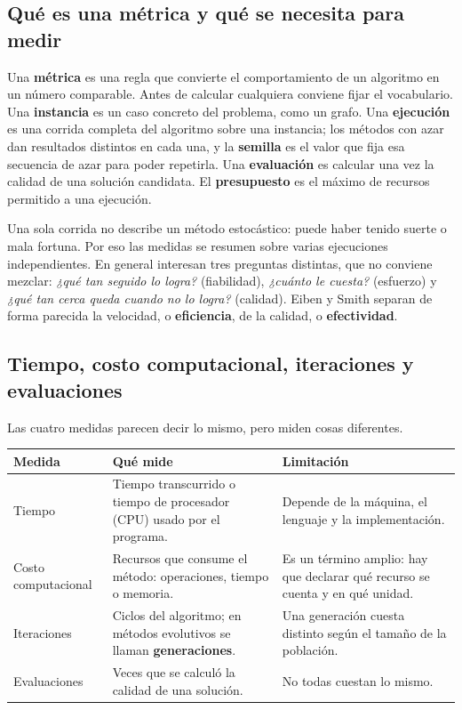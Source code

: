 \documentclass[letterpaper,12pt]{report}
\begin{document}
\subsection{Qué es una métrica y qué se necesita para medir}
Una \textbf{métrica} es una regla que convierte el comportamiento de un algoritmo en un número comparable. Antes de calcular cualquiera conviene fijar el vocabulario. Una \textbf{instancia} es un caso concreto del problema, como un grafo. Una \textbf{ejecución} es una corrida completa del algoritmo sobre una instancia; los métodos con azar dan resultados distintos en cada una, y la \textbf{semilla} es el valor que fija esa secuencia de azar para poder repetirla. Una \textbf{evaluación} es calcular una vez la calidad de una solución candidata. El \textbf{presupuesto} es el máximo de recursos permitido a una ejecución.

Una sola corrida no describe un método estocástico: puede haber tenido suerte o mala fortuna. Por eso las medidas se resumen sobre varias ejecuciones independientes. En general interesan tres preguntas distintas, que no conviene mezclar: \emph{¿qué tan seguido lo logra?} (fiabilidad), \emph{¿cuánto le cuesta?} (esfuerzo) y \emph{¿qué tan cerca queda cuando no lo logra?} (calidad). Eiben y Smith separan de forma parecida la velocidad, o \textbf{eficiencia}, de la calidad, o \textbf{efectividad}.

\subsection{Tiempo, costo computacional, iteraciones y evaluaciones}
Las cuatro medidas parecen decir lo mismo, pero miden cosas diferentes.

\begin{center}
\small
\begin{tabular}{@{}P{2.6cm}P{6.6cm}P{6.6cm}@{}}
\toprule
\textbf{Medida} & \textbf{Qué mide} & \textbf{Limitación}\\
\midrule
Tiempo & Tiempo transcurrido o tiempo de procesador (CPU) usado por el programa. & Depende de la máquina, el lenguaje y la implementación.\\
Costo computacional & Recursos que consume el método: operaciones, tiempo o memoria. & Es un término amplio: hay que declarar qué recurso se cuenta y en qué unidad.\\
Iteraciones & Ciclos del algoritmo; en métodos evolutivos se llaman \textbf{generaciones}. & Una generación cuesta distinto según el tamaño de la población.\\
Evaluaciones & Veces que se calculó la calidad de una solución. & No todas cuestan lo mismo.\\
\bottomrule
\end{tabular}
\end{center}
\end{document}
